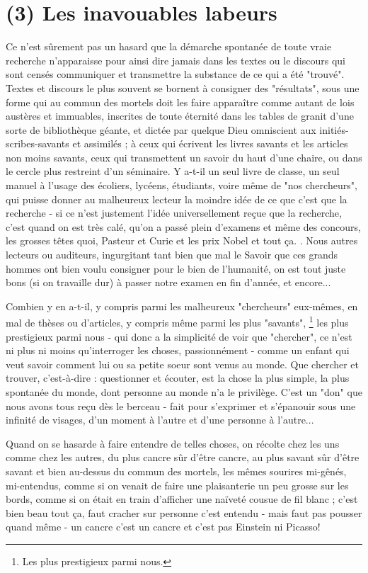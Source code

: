 \section{(3) Les inavouables labeurs}

Ce n'est sûrement pas un hasard que la démarche spontanée de toute vraie recherche n'apparaisse pour ainsi dire jamais dans les textes ou le discours qui sont censés communiquer et transmettre la substance de ce qui a été "trouvé". Textes et discours le plus souvent se bornent à consigner des "résultats", sous une forme qui au commun des mortels doit les faire apparaître comme autant de lois austères et immuables, inscrites de toute éternité dans les tables de granit d'une sorte de bibliothèque géante, et dictée par quelque Dieu omniscient aux initiés-scribes-savants et assimilés ; à ceux qui écrivent les livres savants et les articles non moins savants, ceux qui transmettent un savoir du haut d'une chaire, ou dans le cercle plus restreint d'un séminaire. Y a-t-il un seul livre de classe, un seul manuel à l'usage des écoliers, lycéens, étudiants, voire même de "nos chercheurs", qui puisse donner au malheureux lecteur la moindre idée de ce que c'est que la recherche - si ce n'est justement l'idée universellement reçue que la recherche, c'est quand on est très calé, qu'on a passé plein d'examens et même des concours, les grosses têtes quoi, Pasteur et Curie et les prix Nobel et tout ça. . Nous autres lecteurs ou auditeurs, ingurgitant tant bien que mal le Savoir que ces grands hommes ont bien voulu consigner pour le bien de l'humanité, on est tout juste bons (si on travaille dur) à passer notre examen en fin d'année, et encore...

Combien y en a-t-il, y compris parmi les malheureux "chercheurs" eux-mêmes, en mal de thèses ou d'articles, y compris même parmi les plus "savants", \footnote{Les plus prestigieux parmi nous.} les plus prestigieux parmi nous - qui donc a la simplicité de voir que "chercher", ce n'est ni plus ni moins qu'interroger les choses, passionnément - comme un enfant qui veut savoir comment lui ou sa petite soeur sont venus au monde. Que chercher et trouver, c'est-à-dire : questionner et écouter, est la chose la plus simple, la plus spontanée du monde, dont personne au monde n'a le privilège. C'est un "don" que nous avons tous reçu dès le berceau - fait pour s'exprimer et s'épanouir sous une infinité de visages, d'un moment à l'autre et d'une personne à l'autre...

Quand on se hasarde à faire entendre de telles choses, on récolte chez les uns comme chez les autres, du plus cancre sûr d'être cancre, au plus savant sûr d'être savant et bien au-dessus du commun des mortels, les mêmes sourires mi-gênés, mi-entendus, comme si on venait de faire une plaisanterie un peu grosse sur les bords, comme si on était en train d'afficher une naïveté cousue de fil blanc ; c'est bien beau tout ça, faut cracher sur personne c'est entendu - mais faut pas pousser quand même - un cancre c'est un cancre et c'est pas Einstein ni Picasso!

